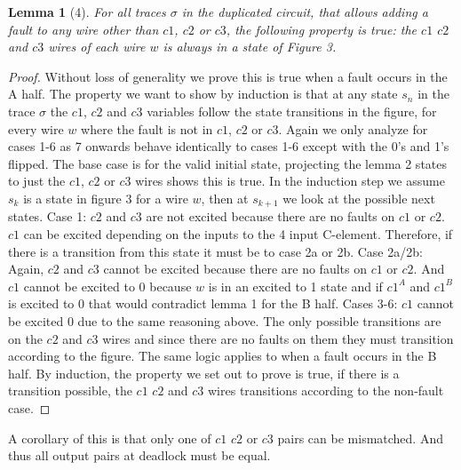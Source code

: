 \documentclass{article}
\newtheorem*{lemma}{Lemma}
\begin{document}
\begin{lemma}[4]
For all traces $\sigma$ in the duplicated circuit, that allows adding a fault to any wire other than $c1$, $c2$ or $c3$, the following property is true: the $c1$ $c2$ and $c3$ wires of each wire $w$ is always in a state of Figure 3.
\end{lemma}
\begin{proof}
Without loss of generality we prove this is true when a fault occurs in the A half.  The property we want to show by induction is that at any state $s_n$ in the trace $\sigma$ the $c1$, $c2$ and $c3$ variables follow the state transitions in the figure, for every wire $w$ where the fault is not in $c1$, $c2$ or $c3$.  Again we only analyze for cases 1-6 as 7 onwards behave identically to cases 1-6 except with the 0's and 1's flipped.\newline
The base case is for the valid initial state, projecting the lemma 2 states to just the $c1$, $c2$ or $c3$ wires shows this is true. \newline
In the induction step we assume $s_k$ is a state in figure 3 for a wire $w$, then at $s_{k+1}$ we look at the possible next states.  \newline
Case 1:  $c2$ and $c3$ are not excited because there are no faults on $c1$ or $c2$.  $c1$ can be excited depending on the inputs to the 4 input C-element.  Therefore, if there is a transition from this state it must be to case 2a or 2b.\newline
Case 2a/2b:  Again, $c2$ and $c3$ cannot be excited because there are no faults on $c1$ or $c2$.  And $c1$ cannot be excited to 0 because $w$ is in an excited to 1 state and if $c1^{A}$ and $c1^{B}$ is excited to 0 that would contradict lemma 1 for the B half.\newline
Cases 3-6:  $c1$ cannot be excited 0 due to the same reasoning above.  The only possible transitions are on the $c2$ and $c3$ wires and since there are no faults on them they must transition according to the figure.
\newline
The same logic applies to when a fault occurs in the B half.  
By induction, the property we set out to prove is true, if there is a transition possible, the  $c1$ $c2$ and $c3$ wires transitions according to the non-fault case.
\end{proof}
A corollary of this is that only one of $c1$ $c2$ or $c3$ pairs can be mismatched.  And thus all output pairs at deadlock must be equal.
\end{document}
